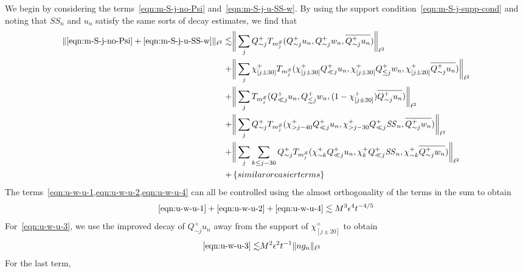 \documentclass[letterpaper, reqno,final]{amsart}
\newcommand{\cS}{\mathcal{S}}
\newcommand{\mSS}{\mathit{SS}}
\newcommand{\btext}[1]{\left\{\textup{#1}\right\}}
\newcommand{\bsime}{\btext{similar or easier terms}}
\begin{document}
We begin by considering the terms~\eqref{eqn:m-S-j-no-Psi} and~\eqref{eqn:m-S-j-u-SS-w}.  By using the support condition~\eqref{eqn:m-S-j-supp-cond} and noting that $\mSS_n$ and $u_n$ satisfy the same sorts of decay estimates, we find that
\begin{subequations}\begin{align}
    \lVert \cramped{\eqref{eqn:m-S-j-no-Psi} + \eqref{eqn:m-S-j-u-SS-w}} \rVert_{\ell^2} \lesssim& \bigg\lVert \sum_{j} Q_{\sim j}^+ T_{m^\cS_j} (Q_{\sim j}^+ u_n, Q_{\sim j}^+ w_n, \overline{Q_{\sim j}^+ u_n}) \bigg\rVert_{\ell^2} \label{eqn:u-w-u-1}\\
    +& \bigg\lVert \sum_{j} \chi_{[j \pm 30]}^+ T_{m^\cS_j} (\chi_{[j \pm 30]}^+ Q_{\ll j}^+ u_n, \chi_{[j \pm 30]}^+ Q_{\lesssim j}^+ w_n, \chi_{[j \pm 20]}^+\overline{Q_{\sim j}^+ u_n}) \bigg\rVert_{\ell^2} \label{eqn:u-w-u-2}\\
    +& \bigg\lVert \sum_{j}  T_{m^\cS_j} ( Q_{\ll j}^+ u_n,  Q_{\lesssim j}^+ w_n, (1 - \chi_{[j \pm 20]}^+) \overline{Q_{\sim j}^+ u_n}) \bigg\rVert_{\ell^2} \label{eqn:u-w-u-3}\\
    +& \bigg\lVert \sum_{j} Q_{\sim j}^+ T_{m^\cS_j} (\chi_{> j - 40}^+ Q_{\ll j}^+ u_n, \chi_{> j - 30}^+ Q_{\ll j}^+ \mSS_n, \overline{Q_{\sim j}^+ w_n}) \bigg\rVert_{\ell^2} \label{eqn:u-w-u-4}\\
    +& \bigg\lVert \sum_{j}\sum_{k \leq j - 30} Q_{\sim j}^+ T_{m^\cS_j} (\chi_{\sim k}^+ Q_{\ll j}^+ u_n, \chi_{k}^+ Q_{\ll j}^+ \mSS_n, \chi_{\sim k}^+\overline{Q_{\sim j}^+ w_n}) \bigg\rVert_{\ell^2} \label{eqn:u-w-u-5}\\
    +& \bsime \nonumber
\end{align}
\end{subequations}
The terms~\cref{eqn:u-w-u-1,eqn:u-w-u-2,eqn:u-w-u-4} can all be controlled using the almost orthogonality of the terms in the sum to obtain
\begin{equation*}
    \eqref{eqn:u-w-u-1} + \eqref{eqn:u-w-u-2} + \eqref{eqn:u-w-u-4} \lesssim M^3 \epsilon^4 t^{-4/5} 
\end{equation*}
For~\eqref{eqn:u-w-u-3}, we use the improved decay of $Q_{\sim j}^+ u_n$ away from the support of $\chi_{[j\pm 20]}^+$ to obtain
\begin{equation*}\begin{split}
    \eqref{eqn:u-w-u-3} \lesssim&  M^2 \epsilon^2 t^{-1}\lVert ng_n \rVert_{\ell^2}
\end{split}
\end{equation*}
For the last term, 
\end{document}
